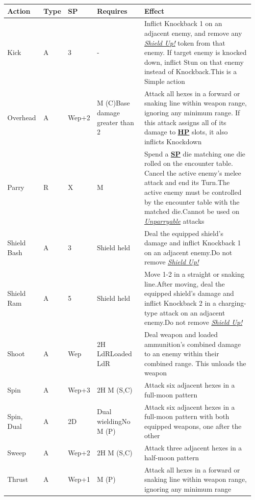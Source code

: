 \documentclass[12pt]{article}
\newcommand{\refto}[1]{\hyperlink{#1}{\textbf{#1}}}
\newcommand{\reftoit}[1]{\hyperlink{#1}{\emph{#1}}}
\begin{document}
\begin{center}
\begin{tabularx}{\textwidth}{p{}p{}p{}p{}p{}}
\hline
\rowcolor{white} \textbf{Action} & \textbf{Type} & \textbf{SP} & \textbf{Requires} & \textbf{Effect}\setcounter{rownum}{0}\\
\hline
Kick & A & 3 & - & Inflict Knockback 1 on an adjacent enemy, and remove any \reftoit{Shield Up!} token from that enemy.\newline
If target enemy is knocked down, inflict Stun on that enemy instead of Knockback.\newline This is a Simple action\\
Overhead & A & Wep+2 & M (C)\newline Base damage greater than 2 & Attack all hexes in a forward or snaking line within weapon range, ignoring any minimum range.\newline
If this attack assigns all of its damage to \refto{HP} slots, it also inflicts Knockdown\\
Parry & R & X & M & Spend a \refto{SP} die matching one die rolled on the encounter table. Cancel the active enemy’s melee attack and end its Turn.\newline The active enemy must be controlled by the encounter table with the matched die.\newline Cannot be used on \reftoit{Unparryable} attacks\\
Shield Bash & A & 3 & Shield held & Deal the equipped shield’s damage and inflict Knockback 1 on an adjacent enemy.\newline Do not remove \reftoit{Shield Up!}\\
Shield Ram & A & 5 & Shield held & Move 1-2 in a straight or snaking line.\newline After moving, deal the equipped shield’s damage and inflict Knockback 2 in a charging-type attack on an adjacent enemy.\newline Do not remove \reftoit{Shield Up!}\\
Shoot & A & Wep & 2H LdR\newline Loaded LdR & Deal weapon and loaded ammunition’s combined damage to an enemy within their combined range. This unloads the weapon\\
Spin & A & Wep+3 & 2H M (S,C) & Attack six adjacent hexes in a full-moon pattern\\
Spin, Dual & A & 2D & Dual wielding\newline No M (P) & Attack six adjacent hexes in a full-moon pattern with both equipped weapons, one after the other\\
Sweep & A & Wep+2 & 2H M (S,C) & Attack three adjacent hexes in a half-moon pattern\\
Thrust & A & Wep+1 & M (P) & Attack all hexes in a forward or snaking line within weapon range, ignoring any minimum range\\
\hline
\end{tabularx}
\end{center}
\end{document}
